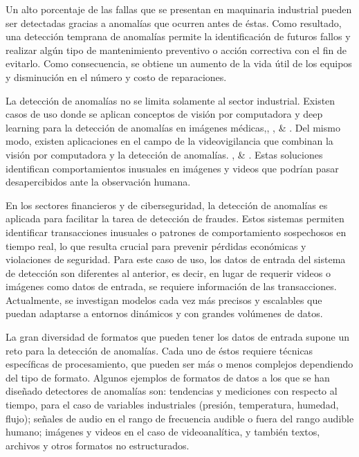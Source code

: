 \documentclass[11pt,a4paper,spanish]{book}
\numberwithin{equation}{chapter}
\numberwithin{figure}{chapter}
\begin{document}
Un alto porcentaje de las fallas que se presentan en maquinaria industrial pueden ser
detectadas gracias a anomalías que ocurren antes de éstas. Como resultado, una detección
temprana de anomalías permite la identificación de futuros fallos y realizar algún tipo 
de mantenimiento preventivo o acción correctiva con el fin de evitarlo. Como 
consecuencia, se obtiene un aumento de la vida útil de los equipos y disminución en el
número y costo de reparaciones. 


La detección de anomalías no se limita solamente al sector industrial. Existen casos de
uso donde se aplican conceptos de visión por computadora y deep learning para la 
detección de anomalías en imágenes médicas,\cite{zhou2021proxy}, \cite{guo2024encoder}, 
\cite{lu2024heterogeneous} \& \cite{zhong2022video}.
Del mismo modo, existen aplicaciones en el campo de la videovigilancia que combinan la 
visión por computadora y la detección de anomalías. \cite{zhong2022video}, 
\cite{zeng2021graph} \& \cite{zhang2022influence}. 
Estas soluciones identifican comportamientos inusuales en imágenes y videos que podrían
pasar desapercibidos ante la observación humana.


En los sectores financieros y de ciberseguridad, la detección de  anomalías es aplicada
para facilitar la tarea de detección de fraudes. Estos sistemas permiten identificar
transacciones inusuales o patrones de comportamiento sospechosos en tiempo real, lo que
resulta crucial para prevenir pérdidas económicas y violaciones de seguridad. Para este
caso de uso, los datos de entrada del sistema de detección son diferentes al anterior,
es decir, en lugar de requerir videos o imágenes como datos de entrada, se requiere
información de las transacciones. 
Actualmente, se 
investigan modelos cada vez más precisos y escalables que puedan adaptarse a entornos 
dinámicos y con grandes volúmenes de datos. 


La gran diversidad de formatos que pueden tener los datos de entrada supone un reto para
la detección de anomalías. Cada uno de éstos requiere técnicas específicas de 
procesamiento, que pueden ser más o menos complejos dependiendo del tipo de formato. 
Algunos ejemplos de formatos de datos a los que se han diseñado detectores de anomalías 
son: tendencias y mediciones con respecto al tiempo, para el caso de variables 
industriales (presión, temperatura, humedad, flujo); señales de audio en el rango de 
frecuencia audible o fuera del rango audible humano; imágenes y videos en el caso de 
videoanalítica, y también textos, archivos y otros formatos no estructurados. 
\end{document}
